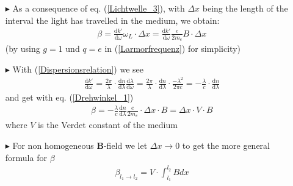 \documentclass[11pt,a4paper]{beamer}
\begin{document}
\begin{frame}
\begin{itemize}
\item[$\blacktriangleright$] As a consequence of eq. (\ref{Lichtwelle_3}), with $\Delta x$ being the length of the interval the light has travelled in the medium, we obtain:
\begin{align}
\beta = \frac{\text{d} k'}{\text{d} \omega}\omega_L\cdot \Delta x = \frac{\text{d} k'}{\text{d} \omega}\frac{e}{2m_e}B\cdot \Delta x
\label{Drehwinkel_1}
\end{align}
(by using $g = 1$ und $ q = e $ in (\ref{Larmorfrequenz}) for simplicity)
\item[$\blacktriangleright$] With (\ref{Dispersionsrelation}) we see
\begin{align}
\frac{\text{d} k'}{\text{d} \omega} = \frac{2\pi}{\lambda}\cdot\frac{\text{d} n}{\text{d} \lambda}\frac{\text{d} \lambda}{\text{d} \omega} = \frac{2\pi}{\lambda}\cdot \frac{\text{d} n}{\text{d} \lambda} \cdot \frac{-\lambda^2}{2\pi c} = -\frac{\lambda}{c} \cdot \frac{\text{d} n}{\text{d} \lambda}
\end{align}
and get with eq. (\ref{Drehwinkel_1})
\begin{align}
\beta = -\frac{\lambda}{c} \frac{\text{d} n}{\text{d} \lambda}\frac{e}{2m_e}\cdot\Delta x\cdot B = \Delta x \cdot V \cdot B
\label{Drehwinkel_2}
\end{align}
where $V$ is the Verdet constant of the medium
\end{itemize}
\end{frame}
\begin{frame}
\begin{itemize}
\item[$\blacktriangleright$] For non homogeneous \textbf{B}-field we let $\Delta x \rightarrow 0$ to get the more general formula for $\beta$
\begin{align}
\beta_{l_1\rightarrow l_2} = V \cdot \int_{l_1}^{l_2} B dx
\end{align}
\end{itemize}
\end{frame}
\end{document}
